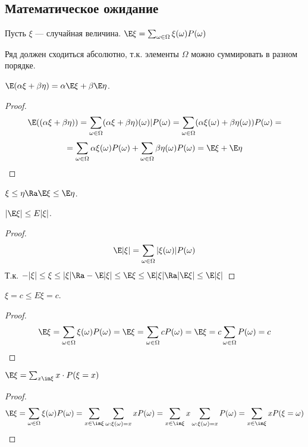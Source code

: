 
\subsection{Математическое ожидание}
\begin{definition}
    Пусть \(\xi\) --- случайная величина. \(\E\xi = \sum_{\omega \in \Omega} \xi(\omega)P(\omega)\)
\end{definition}

\begin{note}
    Ряд должен сходиться абсолютно, т.к. элементы \(\Omega\) можно суммировать в разном порядке.
\end{note}

\begin{proposition}
    \(\E(\alpha\xi + \beta\eta) = \alpha\E\xi + \beta\E\eta\).
\end{proposition}
\begin{proof}
    \[\E((\alpha\xi + \beta\eta)) = \sum_{\omega \in \Omega} (\alpha\xi + \beta\eta)(\omega)|P(\omega) = \sum_{\omega \in \Omega} (\alpha\xi(\omega) + \beta\eta(\omega))P(\omega) =\]
    \[ = \sum_{\omega \in \Omega} \alpha\xi(\omega)P(\omega) + \sum_{\omega \in \Omega} \beta\eta(\omega)P(\omega) = \E\xi + \E\eta\]
\end{proof}
\begin{proposition}
    \(\xi \le \eta \Ra \E\xi \le \E\eta\).
\end{proposition}
\begin{proposition}
    \(|\E\xi| \le E|\xi|\).
\end{proposition}
\begin{proof}
    \[\E|\xi| = \sum_{\omega \in \Omega} |\xi(\omega)|P(\omega)\]
    Т.к. \(-|\xi| \le \xi \le |\xi| \Ra -\E|\xi| \le \E \xi \le \E|\xi| \Ra |\E\xi| \le \E|\xi|\)
\end{proof}
\begin{proposition}
    \(\xi = c \le E\xi = c\).
\end{proposition}
\begin{proof}
    \[\E\xi = \sum_{\omega \in \Omega} \xi(\omega)P(\omega) = \E\xi = \sum_{\omega \in \Omega} c P(\omega) = \E\xi = c \sum_{\omega \in \Omega} P(\omega) = c\]
\end{proof}

\begin{proposition}
    \(\E\xi = \sum_{x \im \xi} x\cdot P(\xi = x)\)
\end{proposition}
\begin{proof}
    \[\E\xi = \sum_{\omega \in \Omega} \xi(\omega)P(\omega) = \sum_{x \in \im \xi}\sum_{\omega: \xi(\omega) = x} x P(\omega) = \sum_{x \in \im \xi}x \sum_{\omega: \xi(\omega) = x} P(\omega) = \sum_{x \in \im \xi}x P(\xi = \omega)\]
\end{proof}

